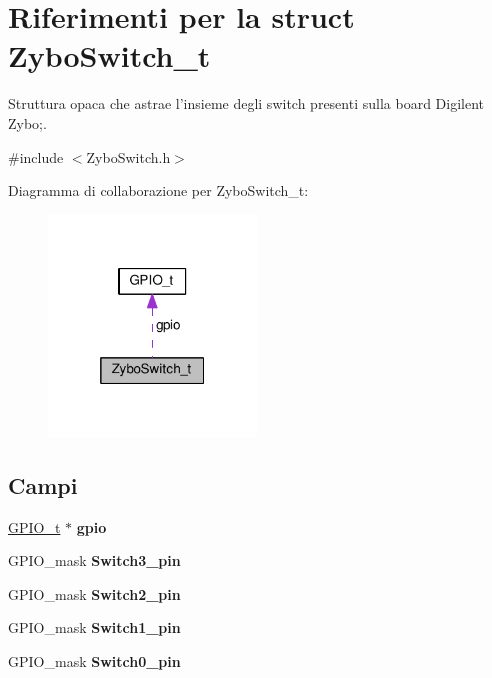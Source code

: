 \hypertarget{struct_zybo_switch__t}{\section{Riferimenti per la struct Zybo\+Switch\+\_\+t}
\label{struct_zybo_switch__t}
}


Struttura opaca che astrae l'insieme degli switch presenti sulla board Digilent Zybo;.  




{\ttfamily \#include $<$Zybo\+Switch.\+h$>$}



Diagramma di collaborazione per Zybo\+Switch\+\_\+t\+:
\nopagebreak
\begin{figure}[H]
\begin{center}
\leavevmode
\includegraphics[width=157pt]{struct_zybo_switch__t__coll__graph}
\end{center}
\end{figure}
\subsection*{Campi}
\begin{DoxyCompactItemize}
\item 
\hypertarget{struct_zybo_switch__t_acb3116190992a4d8d26545c103304d27}{\hyperlink{struct_g_p_i_o__t}{G\+P\+I\+O\+\_\+t} $\ast$ {\bfseries gpio}}\label{struct_zybo_switch__t_acb3116190992a4d8d26545c103304d27}

\item 
\hypertarget{struct_zybo_switch__t_a6b95420b88fe8c1fd7f347ce3ae1906b}{G\+P\+I\+O\+\_\+mask {\bfseries Switch3\+\_\+pin}}\label{struct_zybo_switch__t_a6b95420b88fe8c1fd7f347ce3ae1906b}

\item 
\hypertarget{struct_zybo_switch__t_a33eda4a0115ef585edd90078924ca56e}{G\+P\+I\+O\+\_\+mask {\bfseries Switch2\+\_\+pin}}\label{struct_zybo_switch__t_a33eda4a0115ef585edd90078924ca56e}

\item 
\hypertarget{struct_zybo_switch__t_a6a3a5739e7e8f138241cafeeb7c1a33f}{G\+P\+I\+O\+\_\+mask {\bfseries Switch1\+\_\+pin}}\label{struct_zybo_switch__t_a6a3a5739e7e8f138241cafeeb7c1a33f}

\item 
\hypertarget{struct_zybo_switch__t_a5b7f83cd96441b7d1692710c6499147c}{G\+P\+I\+O\+\_\+mask {\bfseries Switch0\+\_\+pin}}\label{struct_zybo_switch__t_a5b7f83cd96441b7d1692710c6499147c}

\end{DoxyCompactItemize}


